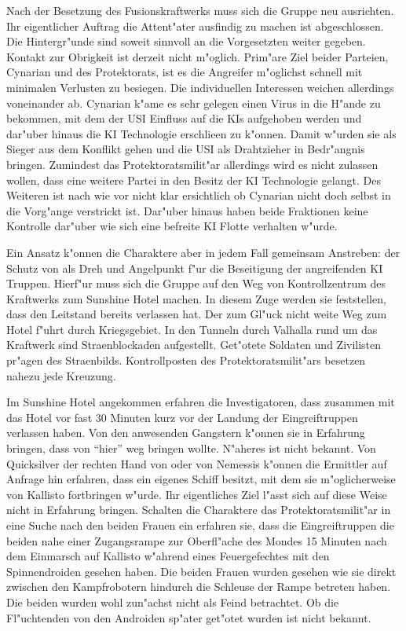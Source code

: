 
Nach der Besetzung des Fusionskraftwerks muss sich die Gruppe neu ausrichten. Ihr eigentlicher Auftrag die Attent"ater ausfindig zu machen ist abgeschlossen. Die Hintergr"unde sind soweit sinnvoll an die Vorgesetzten weiter gegeben. Kontakt zur Obrigkeit ist derzeit nicht m"oglich. Prim"are Ziel beider Parteien, Cynarian und des Protektorats, ist es die Angreifer m"oglichst schnell mit minimalen Verlusten zu besiegen. Die individuellen Interessen weichen allerdings voneinander ab. Cynarian k"ame es sehr gelegen einen Virus in die H"ande zu bekommen, mit dem der USI Einfluss auf die KIs aufgehoben werden und dar"uber hinaus die KI Technologie erschlie\3en zu k"onnen. Damit w"urden sie als Sieger aus dem Konflikt gehen und die USI als Drahtzieher in Bedr"angnis bringen. Zumindest das Protektoratsmilit"ar allerdings wird es nicht zulassen wollen, dass eine weitere Partei in den Besitz der KI Technologie gelangt. Des Weiteren ist nach wie vor nicht klar ersichtlich ob Cynarian nicht doch selbst in die Vorg"ange verstrickt ist. Dar"uber hinaus haben beide Fraktionen keine Kontrolle dar"uber wie sich eine befreite KI Flotte verhalten w"urde.

Ein Ansatz k"onnen die Charaktere aber in jedem Fall gemeinsam Anstreben: der Schutz von \ml{} als Dreh und Angelpunkt f"ur die Beseitigung der angreifenden KI Truppen. Hierf"ur muss sich die Gruppe auf den Weg von Kontrollzentrum des Kraftwerks zum Sunshine Hotel machen. In diesem Zuge werden sie feststellen, dass \xl{} den Leitstand bereits verlassen hat. Der zum Gl"uck nicht weite Weg zum Hotel f"uhrt durch Kriegsgebiet. In den Tunneln durch Valhalla rund um das Kraftwerk sind Stra\3enblockaden aufgestellt. Get"otete Soldaten und Zivilisten pr"agen des Stra\3enbilds. Kontrollposten des Protektoratsmilit"ars besetzen nahezu jede Kreuzung.

Im Sunshine Hotel angekommen erfahren die Investigatoren, dass \xl{} zusammen mit \ml{} das Hotel vor fast 30 Minuten kurz vor der Landung der Eingreiftruppen verlassen haben. Von den anwesenden Gangstern k"onnen sie in Erfahrung bringen, dass \xl{} \ml{} von "`hier"' weg bringen wollte. N"aheres ist nicht bekannt. Von Quicksilver der rechten Hand von \ml{} oder von Nemessis k"onnen die Ermittler auf Anfrage hin erfahren, dass \xl{} ein eigenes Schiff besitzt, mit dem sie m"oglicherweise \ml{} von Kallisto fortbringen w"urde. Ihr eigentliches Ziel l"asst sich auf diese Weise nicht in Erfahrung bringen. Schalten die Charaktere das Protektoratsmilit"ar in eine Suche nach den beiden Frauen ein erfahren sie, dass die Eingreiftruppen die beiden nahe einer Zugangsrampe zur Oberfl"ache des Mondes 15 Minuten nach dem Einmarsch auf Kallisto w"ahrend eines Feuergefechtes mit den Spinnendroiden gesehen haben. Die beiden Frauen wurden gesehen wie sie direkt zwischen den Kampfrobotern hindurch die Schleuse der Rampe betreten haben. Die beiden wurden wohl zun"achst nicht als Feind betrachtet. Ob die Fl"uchtenden von den Androiden sp"ater get"otet wurden ist nicht bekannt.


